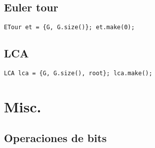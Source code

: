     \subsection{Euler tour}
        \texttt{ETour et = \{G, G.size()\}; et.make(0);}
        
    \subsection{LCA}
        \texttt{LCA lca = \{G, G.size(), root\}; lca.make();}

\section{Misc.}
    \subsection{Operaciones de bits}



